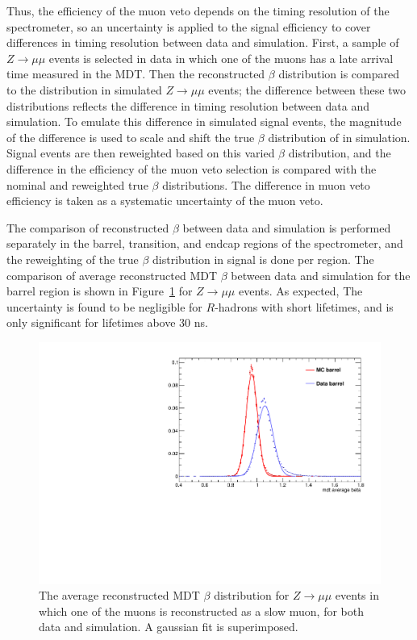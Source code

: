 Thus, the efficiency of the muon veto depends on the timing resolution of the spectrometer, so an uncertainty is applied to the signal efficiency to cover differences in timing resolution between data and simulation. 
First, a sample of $Z\rightarrow\mu\mu$ events is selected in data in which one of the muons has a late arrival time measured in the \ac{MDT}. 
Then the reconstructed $\beta$ distribution is compared to the distribution in simulated $Z\rightarrow\mu\mu$ events; the difference between these two distributions reflects the difference in timing resolution between data and simulation.
To emulate this difference in simulated signal events, the magnitude of the difference is used to scale and shift the true $\beta$ distribution of \rhadrons in simulation. 
Signal events are then reweighted based on this varied $\beta$ distribution, and the difference in the efficiency of the muon veto selection is compared with the nominal and reweighted true $\beta$ distributions. 
The difference in muon veto efficiency is taken as a systematic uncertainty of the muon veto. 
 
The comparison of reconstructed $\beta$ between data and simulation is performed separately in the barrel, transition, and endcap regions of the spectrometer, and the reweighting of the true $\beta$ distribution in signal is done per region. 
The comparison of average reconstructed \ac{MDT} $\beta$ between data and simulation for the barrel region is shown in Figure~\ref{fig:mdt_beta} for $Z\rightarrow\mu\mu$ events.
As expected, The uncertainty is found to be negligible for $R$-hadrons with short lifetimes, and is only significant for lifetimes above 30 ns.

\begin{figure}[hbtp]
\centering
\includegraphics[width=\fullfig]{figures/beta_muonveto.pdf}
\caption{The average reconstructed MDT $\beta$ distribution for $Z\rightarrow\mu\mu$ events in which one of the muons is reconstructed as a slow muon, for both data and simulation. A gaussian fit is superimposed.}
\label{fig:mdt_beta}
\end{figure}

